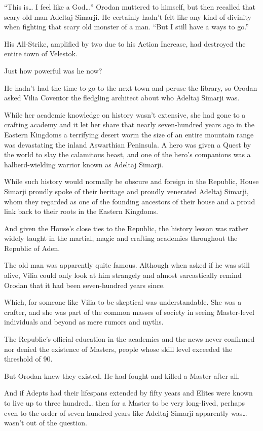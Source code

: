 \documentclass[a4paper,10pt]{book}
\begin{document}
“This is… I feel like a God…” Orodan muttered to himself, but then recalled that scary old man Adeltaj Simarji. He certainly hadn’t felt like any kind of divinity when fighting that scary old monster of a man. “But I still have a ways to go.”\par
His All-Strike, amplified by two due to his Action Increase, had destroyed the entire town of Velestok.\par
Just how powerful was he now?\par
He hadn’t had the time to go to the next town and peruse the library, so Orodan asked Vilia Coventor the fledgling architect about who Adeltaj Simarji was.\par
While her academic knowledge on history wasn’t extensive, she had gone to a crafting academy and it let her share that nearly seven-hundred years ago in the Eastern Kingdoms a terrifying desert worm the size of an entire mountain range was devastating the inland Aswarthian Peninsula. A hero was given a Quest by the world to slay the calamitous beast, and one of the hero’s companions was a halberd-wielding warrior known as Adeltaj Simarji.\par
While such history would normally be obscure and foreign in the Republic, House Simarji proudly spoke of their heritage and proudly venerated Adeltaj Simarji, whom they regarded as one of the founding ancestors of their house and a proud link back to their roots in the Eastern Kingdoms.\par
And given the House’s close ties to the Republic, the history lesson was rather widely taught in the martial, magic and crafting academies throughout the Republic of Aden.\par
The old man was apparently quite famous. Although when asked if he was still alive, Vilia could only look at him strangely and almost sarcastically remind Orodan that it had been seven-hundred years since.\par
Which, for someone like Vilia to be skeptical was understandable. She was a crafter, and she was part of the common masses of society in seeing Master-level individuals and beyond as mere rumors and myths.\par
The Republic’s official education in the academies and the news never confirmed nor denied the existence of Masters, people whose skill level exceeded the threshold of 90.\par
But Orodan knew they existed. He had fought and killed a Master after all.\par
And if Adepts had their lifespans extended by fifty years and Elites were known to live up to three hundred… then for a Master to be very long-lived, perhaps even to the order of seven-hundred years like Adeltaj Simarji apparently was… wasn’t out of the question.\par
\end{document}
